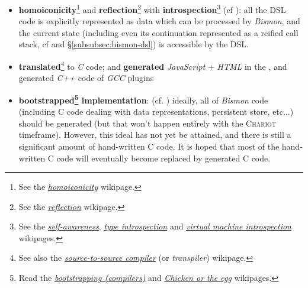 \begin{itemize}
  \item \textbf{homoiconicity}\footnote{See the
    \href{https://en.wikipedia.org/wiki/Homoiconicity}{\emph{homoiconicity}}
    wikipage.} and \textbf{reflection}\footnote{See the
    \href{https://en.wikipedia.org/wiki/Reflection\_(computer\_programming)}{\emph{reflection}}
    wikipage.} with \textbf{introspection}\footnote{See the
    \href{https://en.wikipedia.org/wiki/Self-awareness}{\emph{self-awareness}},
    \href{https://en.wikipedia.org/wiki/Type\_introspection}{\emph{type
        introspection}} and
    \href{https://en.wikipedia.org/wiki/Virtual\_machine\_introspection}{\emph{virtual
        machine introspection}} wikipages.} (cf
    \cite{Pitrat:1996:FGCS, Pitrat:1990:Metaconnaissances,
      Pitrat:2009:AST, Pitrat:2009:ArtifBeings,
      Doucet:2003:introspection, carle-1992-meringIV}): all the DSL
    code is explicitly represented as data which can be processed by
    \textit{Bismon}, and the current state (including even its
    continuation represented as a reified call stack, cf
    \cite{fouet-starynkevitch:describing-control:1987,
      fouet-1987:gosseyn, Starynkevitch-1990-EUM,
      Reynolds:1993:continuations} and \S\ref{subsubsec:bismon-dsl}) is
    accessible by the DSL.

    \item \textbf{translated}\footnote{See also the
      \href{https://en.wikipedia.org/wiki/Source-to-source_compiler}{\emph{source-to-source
          compiler}} (or \emph{transpiler}) wikipage.} to \emph{C}
      code; and \textbf{generated} \emph{JavaScript} + \emph{HTML} in
      the , and generated \emph{C++} code of
      \emph{GCC} plugins 

    \item \textbf{bootstrapped\footnote{Read the \href{https://en.wikipedia.org/wiki/Bootstrapping_(compilers)}{\emph{bootstrapping (compilers)}} and \href{https://en.wikipedia.org/wiki/Chicken\_or\_the\_egg}{\emph{Chicken or the egg}} wikipages.} implementation}:  (cf. \cite{Pitrat:1996:FGCS, Polito:2014:Bootstrapping-pharo})
      ideally, all of \textit{Bismon} code (including C code dealing
      with data representations, persistent store, etc...) should be
      generated (but that won't happen entirely with the
      \textsc{Chariot} timeframe). However, this ideal has not yet be
      attained, and there is still a significant amount of
      hand-written C code. It is hoped that most of the hand-written C
      code will eventually become replaced by generated C code.
      

\end{itemize}
